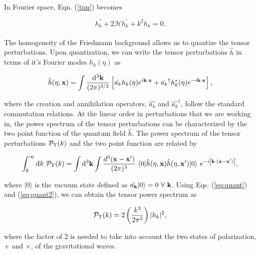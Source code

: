 \documentclass[12pt,a4paper,oneside]{book}
\begin{document}
\paragraph*{} In Fourier space, Eqn. (\ref{tpn}) becomes

\begin{equation}\label{tp:fs}
h_k^{''} + 2{\mathcal{H}}h_k^{'} + k^2	h_k = 0.
\end{equation}

\paragraph*{} The homogeneity of the Friedmann background allows us to quantize the tensor perturbations. 
Upon quantization, we can write the tensor perturbations $\hat{h}$ in terms of it's Fourier modes $h_k(\eta)$ as

\begin{equation}\label{eq:quant}
\hat{h}(\eta, {\bf x}) = \int \frac{{\rm d}^3\bf{k}}{(2\pi)^{3/2}} \left[\hat{a_k}h_k(\eta)e^{i\bf{k\cdot x}}+ \hat{a_k}^{\dagger}h_k^{*}(\eta)e^{-i\bf{k\cdot x}}\right] ,
\end{equation}

\noindent where the creation and annihilation operators, $\hat{a_k}$ and $\hat{a_k}^{\dagger}$, follow the standard commutation relations. At the linear order in perturbations that we are working in, the power spectrum of the tensor perturbations can be characterized by the two point function of the quantum field $\hat{h}$. The power spectrum of the tensor perturbations ${\mathcal{P}}_{\rm T}(k)$ and the two point function are related by

\begin{equation}\label{eq:quant2}
\int^{\infty}_0 {\rm d}k ~{\mathcal{P}}_{\rm T}(k) = \int {\rm d}^3{\bf{k}}\int\frac{d^3(\bf{x}-\bf{x'})}{(2\pi)^3}~\langle 0|\hat{h}(\eta,{\bf{x}})\hat{h}(\eta, {\bf{x'}})|0\rangle ~e^{-i{\bf{\left[k \cdot (x-x')\right]}}},
\end{equation}

\noindent where $|0\rangle$ is the vacuum state defined as $\hat{a_{\bf k}}|0\rangle = 0 ~\forall ~{\bf k}$. 
Using Eqs. (\ref{eq:quant}) and (\ref{eq:quant2}), we can obtain the tensor power spectrum as

\begin{equation}\label{eq:tps}
{\mathcal{P}}_{\rm T}(k) = 2 \left(\frac{k^3}{2\pi^2}\right) |h_k|^2,
\end{equation}

\noindent where the factor of 2 is needed to take into account the two states of polarization, $+$ and $\times$, of the gravitational waves.
\end{document}
